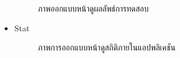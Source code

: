 \documentclass[12pt,oneside,openright,a4paper]{cpe-thai-project}
\begin{document}
\begin{itemize}
\begin{figure}[!ht]
      \caption{ภาพออกแบบหน้าดูผลลัพธ์การทดสอบ}\label{fig:system}
    \end{figure}
  \newpage
  \item Stat
    \begin{figure}[!ht]\centering
      \setlength{\fboxrule}{0.2mm} %
      \setlength{\fboxsep}{1cm}
      \caption{ภาพการออกแบบหน้าดูสถิติภายในแอปพลิเคชัน}\label{fig:system}
        
  \end{figure}
\end{itemize}
\newpage
\end{document}
